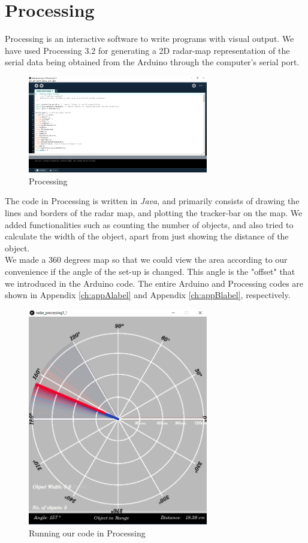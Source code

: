 \section{Processing}
Processing is an interactive software to write programs with visual output. We have used Processing 3.2 for generating a 2D radar-map representation of the serial data being obtained from the Arduino through the computer's serial port.
\begin{figure}[H]
	\vfill
	\centering
	\includegraphics[width=0.7\textwidth]{../Files/processing}
	\caption{Processing}  \label{fig:processing}
\end{figure}
The code in Processing is written in \emph{Java}, and primarily consists of drawing the lines and borders of the radar map, and plotting the tracker-bar on the map. We added functionalities such as counting the number of objects, and also tried to calculate the width of the object, apart from just showing the distance of the object. \\
We made a 360 degrees map so that we could view the area according to our convenience if the angle of the set-up is changed. This angle is the "offset" that we introduced in the Arduino code. The entire Arduino and Processing codes are shown in Appendix \ref{ch:appAlabel} and Appendix \ref{ch:appBlabel}, respectively.
\begin{figure}[H]
	\vfill
	\centering
	\includegraphics[width=0.7\textwidth]{../Files/radar}
	\caption{Running our code in Processing}  \label{fig:radar}
\end{figure}
\clearpage